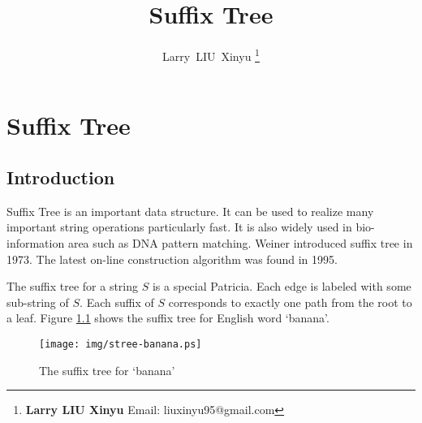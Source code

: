 \documentclass{article}
\begin{document}


\title{Suffix Tree}

\author{Larry~LIU~Xinyu
\thanks{{\bfseries Larry LIU Xinyu } \newline
  Email: liuxinyu95@gmail.com \newline}
  }

\maketitle
\fi


\ifx\wholebook\relax
\chapter{Suffix Tree}
\fi


\section{Introduction}
\label{introduction}

Suffix Tree is an important data structure.
It can be used to realize many important string operations particularly
fast\cite{wiki-suffix-tree}. It is
also widely used in bio-information area such as DNA pattern
matching\cite{ukkonen-presentation}.
Weiner introduced suffix tree in 1973\cite{weiner73}.
The latest on-line construction algorithm was found in 1995\cite{ukkonen95}.

The suffix tree for a string $S$ is a special Patricia.
Each edge is labeled with some sub-string of $S$.
Each suffix of $S$ corresponds to exactly one path
from the root to a leaf. Figure \ref{fig:stree-banana} shows the suffix tree for
English word `banana'.

\begin{figure}[htbp]
  \centering
  \texttt{[image: img/stree-banana.ps]}
  \caption{The suffix tree for `banana'} \label{fig:stree-banana}
\end{figure}
\end{document}

